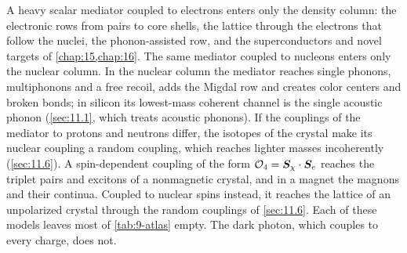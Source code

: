 A heavy scalar mediator coupled to electrons enters only the density column: the electronic rows from pairs to core shells, the lattice through the electrons that follow the nuclei, the phonon-assisted row, and the superconductors and novel targets of \cref{chap:15,chap:16}. The same mediator coupled to nucleons enters only the nuclear column. In the nuclear column the mediator reaches single phonons, multiphonons and a free recoil, adds the Migdal row and creates color centers and broken bonds; in silicon its lowest-mass coherent channel is the single acoustic phonon (\cref{sec:11.1}, which treats acoustic phonons). If the couplings of the mediator to protons and neutrons differ, the isotopes of the crystal make its nuclear coupling a random coupling, which reaches lighter masses incoherently (\cref{sec:11.6}). A spin-dependent coupling of the form $\mathcal{O}_4 = \bm{S}_\chi\cdot\bm{S}_e$ reaches the triplet pairs and excitons of a nonmagnetic crystal, and in a magnet the magnons and their continua. Coupled to nuclear spins instead, it reaches the lattice of an unpolarized crystal through the random couplings of \cref{sec:11.6}. Each of these models leaves most of \cref{tab:9-atlas} empty. The dark photon, which couples to every charge, does not.

